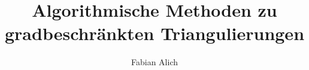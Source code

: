 \documentclass[fleqn,11pt,aspectratio=169]{beamer}
\title{Algorithmische Methoden zu gradbeschränkten Triangulierungen}
\author{Fabian Alich}
\begin{document}
\begin{frame}[plain]
\titlepage
\end{frame}







\end{document}
